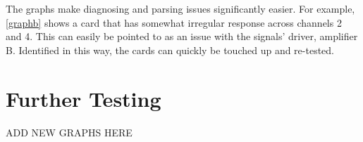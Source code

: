 The graphs make diagnosing and parsing issues significantly easier. For example, \ref{graphb} shows a card that has somewhat irregular response across channels 2 and 4. This can easily be pointed to as an issue with the signals' driver, amplifier B. Identified in this way, the cards can quickly be touched up and re-tested.
\section{Further Testing}
ADD NEW GRAPHS HERE